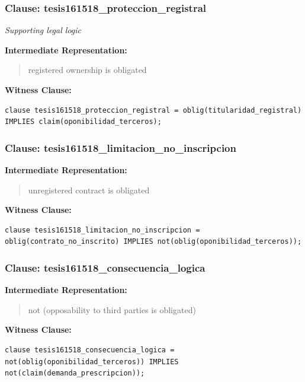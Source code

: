 \documentclass[11pt,a4paper]{article}
\begin{document}
\subsubsection{Clause: tesis161518\_proteccion\_registral}

\textit{Supporting legal logic}

\textbf{Intermediate Representation:}

\begin{quote}
registered ownership is obligated
\end{quote}

\textbf{Witness Clause:}

\begin{lstlisting}[style=witnessstyle, language=Witness]
clause tesis161518_proteccion_registral = oblig(titularidad_registral) IMPLIES claim(oponibilidad_terceros);
\end{lstlisting}

\subsubsection{Clause: tesis161518\_limitacion\_no\_inscripcion}

\textbf{Intermediate Representation:}

\begin{quote}
unregistered contract is obligated
\end{quote}

\textbf{Witness Clause:}

\begin{lstlisting}[style=witnessstyle, language=Witness]
clause tesis161518_limitacion_no_inscripcion = oblig(contrato_no_inscrito) IMPLIES not(oblig(oponibilidad_terceros));
\end{lstlisting}

\subsubsection{Clause: tesis161518\_consecuencia\_logica}

\textbf{Intermediate Representation:}

\begin{quote}
not (opposability to third parties is obligated)
\end{quote}

\textbf{Witness Clause:}

\begin{lstlisting}[style=witnessstyle, language=Witness]
clause tesis161518_consecuencia_logica = not(oblig(oponibilidad_terceros)) IMPLIES not(claim(demanda_prescripcion));
\end{lstlisting}
\end{document}
